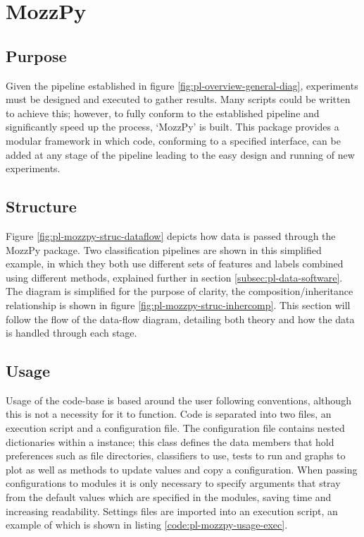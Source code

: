 \section{MozzPy}
\label{sec:pl-mozzpy}
    \subsection{Purpose}
    \label{subsec:pl-mozzpy-purp}
        Given the pipeline established in figure \ref{fig:pl-overview-general-diag}, experiments must be designed and executed to gather results. Many scripts could be written to achieve this; however, to fully conform to the established pipeline and significantly speed up the process, `MozzPy' is built. This package provides a modular framework in which code, conforming to a specified interface, can be added at any stage of the pipeline leading to the easy design and running of new experiments.
    
    \subsection{Structure}
    \label{subsec:pl-mozzpy-struc}
        
        
        Figure \ref{fig:pl-mozzpy-struc-dataflow} depicts how data is passed through the MozzPy package. Two classification pipelines are shown in this simplified example, in which they both use different sets of features and labels combined using different methods, explained further in section \ref{subsec:pl-data-software}. The diagram is simplified for the purpose of clarity, the composition/inheritance relationship is shown in figure \ref{fig:pl-mozzpy-struc-inhercomp}. This section will follow the flow of the data-flow diagram, detailing both theory and how the data is handled through each stage.
  
        
    
    \subsection{Usage}
    \label{subsec:pl-mozzpy-usage}
        Usage of the code-base is based around the user following conventions, although this is not a necessity for it to function. Code is separated into two files, an execution script and a configuration file. The configuration file contains nested dictionaries within a  instance; this class defines the data members that hold preferences such as file directories, classifiers to use, tests to run and graphs to plot as well as methods to update values and copy a configuration. When passing configurations to modules it is only necessary to specify arguments that stray from the default values which are specified in the modules, saving time and increasing readability. Settings files are imported into an execution script, an example of which is shown in listing \ref{code:pl-mozzpy-usage-exec}.

